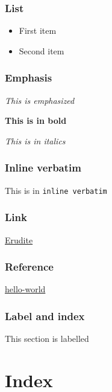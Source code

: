 \documentclass[11pt,pdflatex,makeidx]{scrbook}   %
\begin{document}
\subsection{List}
\begin{itemize}
\item First item
\item Second item
\end{itemize}

\subsection{Emphasis}
\emph{This is emphasized}

\textbf{This is in bold}

\textit{This is in italics}

\subsection{Inline verbatim}
This is in \verb|inline verbatim|

\subsection{Link}
\href{https://github.com/mmontone/erudite}{Erudite}

\subsection{Reference}
\hyperref[hello-world]{hello-world}

\subsection{Label and index}
\label{label-test}
This section is labelled
\chapter{Index}
\printindex
\end{document}
